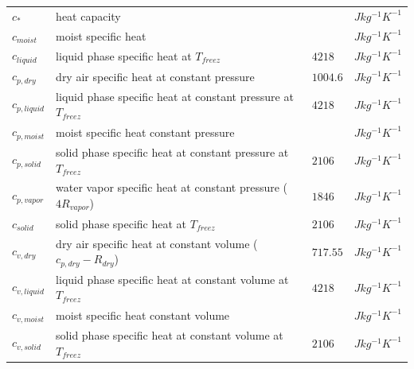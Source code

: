 \documentclass[letterpaper,titlepage,10pt]{article}
\numberwithin{equation}{section}
\begin{document}
\begin{appendices}
\begin{longtable}{p{}p{}p{}p{}}
	$c_*$              & heat capacity                                                                        &                            & $J kg^{-1} K^{-1}$ \\
	$c_{moist}$        & moist specific heat                                                                  &                            & $J kg^{-1} K^{-1}$ \\
	$c_{liquid}$       & liquid phase specific heat at $T_{freez}$                                            & $4218$                     & $J kg^{-1} K^{-1}$ \\
	$c_{p,dry}$        & dry air specific heat at constant pressure                                           & $1004.6$                   & $J kg^{-1} K^{-1}$ \\
	$c_{p,liquid}$     & liquid phase specific heat at constant pressure at $T_{freez}$                       & $4218$                     & $J kg^{-1} K^{-1}$ \\
	$c_{p,moist}$      & moist specific heat constant pressure                                                &                            & $J kg^{-1} K^{-1}$ \\
	$c_{p,solid}$      & solid phase specific heat at constant pressure at $T_{freez}$                        & $2106$                     & $J kg^{-1} K^{-1}$ \\
	$c_{p,vapor}$      & water vapor specific heat at constant pressure ($4 R_{vapor}$)                       & $1846$                     & $J kg^{-1} K^{-1}$ \\
	$c_{solid}$        & solid phase specific heat at $T_{freez}$                                             & $2106$                     & $J kg^{-1} K^{-1}$ \\
	$c_{v,dry}$        & dry air specific heat at constant volume ($c_{p,dry} - R_{dry}$)                     & $717.55$                   & $J kg^{-1} K^{-1}$ \\
	$c_{v,liquid}$     & liquid phase specific heat at constant volume at $T_{freez}$                         & $4218$                     & $J kg^{-1} K^{-1}$ \\
	$c_{v,moist}$      & moist specific heat constant volume                                                  &                            & $J kg^{-1} K^{-1}$ \\
	$c_{v,solid}$      & solid phase specific heat at constant volume at $T_{freez}$                          & $2106$                     & $J kg^{-1} K^{-1}$ \\

\end{longtable}
\end{appendices}
\end{document}
